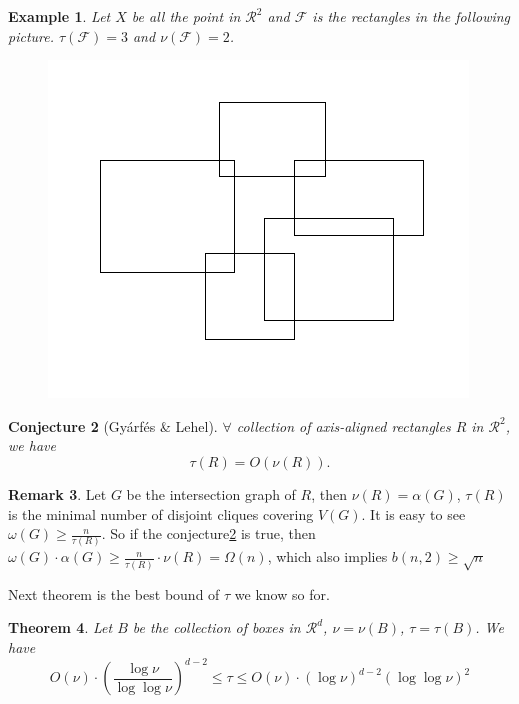 \documentclass{article}
\newtheorem{theorem}{Theorem}[section]
\newtheorem{conjecture}[theorem]{Conjecture}
\newtheorem{example}[theorem]{Example}
\theoremstyle{definition}
\newtheorem{remark}[theorem]{Remark}
\begin{document}
\begin{example}
    Let $X$ be all the point in $\mathcal{R}^2$ and $\mathcal{F}$ is the rectangles in the following picture. $\tau(\mathcal{F})=3$ and $\nu(\mathcal{F})=2$.
    \begin{figure}[H]
        \centering
        \includegraphics[scale=0.7]{15-2.png}
    \end{figure}
    
\end{example}

\begin{conjecture}[Gy\'arf\'es \& Lehel]\label{conj15.9}
    $\forall$ collection of axis-aligned rectangles $R$ in $\mathcal{R}^2$, we have
    \begin{equation*}
        \tau(R)=O(\nu(R)).
    \end{equation*}
\end{conjecture}
\begin{remark}
    Let $G$ be the intersection graph of $R$, then $\nu (R)=\alpha(G)$, $\tau(R)$ is the minimal number of disjoint cliques covering $V(G)$. It is easy to see $\omega(G)\geq \frac{n}{\tau(R)}$. So if the conjecture\ref{conj15.9} is true, then $\omega(G)\cdot\alpha(G) \geq \frac{n}{\tau(R)}\cdot \nu (R)= \Omega(n)$, which  also implies $b(n,2)\geq \sqrt{n}$
\end{remark}
Next theorem is the best bound of $\tau$ we know so for.
\begin{theorem}\cite{tomon2022lower}
Let $B$ be the collection of boxes in $\mathcal{R}^d$, $\nu=\nu(B)$, $\tau=\tau(B)$. We have
\begin{equation*}
    O(\nu)\cdot(\frac{\log \nu}{\log\log\nu})^{d-2}\leq \tau\leq O(\nu)\cdot (\log\nu)^{d-2}(\log\log\nu)^2
\end{equation*}
\end{theorem}
\end{document}
